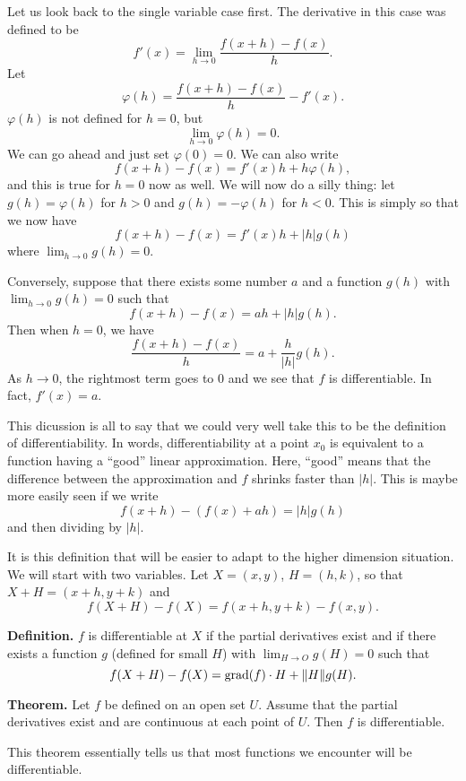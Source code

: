 \documentclass{article}
\DeclareMathOperator{\grd}{grad}
\begin{document}
Let us look back to the single variable case first. The derivative
in this case was defined to be
\[f'(x) = \lim_{h \to 0} \frac{f(x+h) - f(x)}{h}.\]
Let 
\[\varphi(h) = \frac{f(x+h) - f(x)}{h} - f'(x).\]
$\varphi(h)$ is not defined for $h=0$, but 
\[\lim_{h \to 0} \varphi(h) = 0.\]
We can go ahead and just set $\varphi(0)=0$.
We can also write 
\[f(x+h) - f(x) = f'(x)h + h\varphi(h),\]
and this is true for $h=0$ now as well. We will now do a silly thing:
let $g(h) = \varphi(h)$ for $h>0$ and $g(h) = -\varphi(h)$ for $h<0$. This is simply
so that we now have
\[f(x+h) - f(x) = f'(x)h + |h|g(h)\]
where $\lim_{h\to 0} g(h)=0$.

Conversely, suppose that there exists some number $a$ 
and a function $g(h)$ 
with $\lim_{h \to 0} g(h) = 0$ such that
\[f(x+h) - f(x) = ah + |h|g(h).\]
Then when $h=0$, we have
\[\frac{f(x+h)-f(x)}{h} = a + \frac{h}{|h|} g(h).\]
As $h \to 0$, the rightmost term goes to $0$ and we see that $f$
is differentiable. In fact, $f'(x) = a$.


This dicussion is all to say that we could very well take this
to be the definition of differentiability. In words, differentiability
at a point $x_0$ is equivalent to a function having a ``good'' linear approximation.
Here, ``good'' means that the difference between the approximation and $f$
shrinks faster than $|h|$. This is maybe more easily seen if we write
\[f(x+h) - \left( f(x) + ah \right) = |h|g(h)\]
and then dividing by $|h|$.

It is this definition that will be easier to adapt to the higher dimension 
situation. We will start with two variables. Let $X=(x,y)$, $H=(h,k)$,
so that $X+H=(x+h,y+k)$ and 
\[f(X+H)-f(X) = f(x+h,y+k) - f(x,y).\]

\textbf{Definition.} $f$ is differentiable at $X$ if the partial derivatives 
exist and if there exists a function $g$ (defined for small $H$) 
with $\lim_{H \to O} g(H) = 0$ such that
\[f(X+H) - f(X) = \grd(f)\cdot H + \norm{H}g(H).\]

\textbf{Theorem.} Let $f$ be defined on an open set $U$. Assume that
the partial derivatives exist and are continuous at each point of $U$.
Then $f$ is differentiable.

This theorem essentially tells us that most functions we encounter
will be differentiable.
\end{document}
